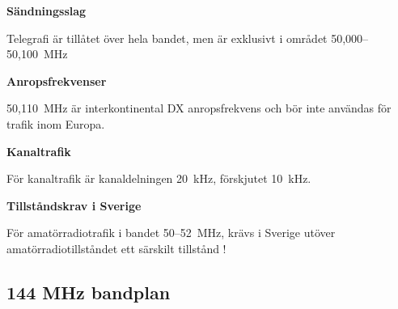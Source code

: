 \textbf{Sändningsslag}

Telegrafi är tillåtet över hela bandet, men är exklusivt i området
50,000--50,100~MHz

\textbf{Anropsfrekvenser}

50,110~MHz är interkontinental DX anropsfrekvens och bör inte användas
för trafik inom Europa.

\textbf{Kanaltrafik}

För kanaltrafik är kanaldelningen 20~kHz, förskjutet 10~kHz.

\textbf{Tillståndskrav i Sverige}

För amatörradiotrafik i bandet 50--52~MHz, krävs i Sverige utöver
amatörradiotillståndet ett särskilt tillstånd !

\subsection{144 MHz bandplan}

